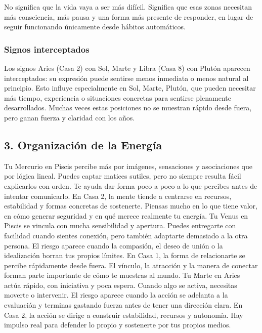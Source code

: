 \documentclass[11pt,a4paper]{article}\usepackage[utf8]{inputenc}
\begin{document}
No significa que la vida vaya a ser más difícil. Significa que esas zonas necesitan más consciencia, más pausa y una forma más presente de responder, en lugar de seguir funcionando únicamente desde hábitos automáticos.


\subsubsection*{Signos interceptados}
Los signos Aries (Casa 2) con Sol, Marte y Libra (Casa 8) con Plutón aparecen interceptados: su expresión puede sentirse menos inmediata o menos natural al principio. Esto influye especialmente en Sol, Marte, Plutón, que pueden necesitar más tiempo, experiencia o situaciones concretas para sentirse plenamente desarrollados. Muchas veces estas posiciones no se muestran rápido desde fuera, pero ganan fuerza y claridad con los años.

\vspace{0.8cm}

\subsection{3. Organización de la Energía}

Tu Mercurio en Piscis percibe más por imágenes, sensaciones y asociaciones que por lógica lineal. Puedes captar matices sutiles, pero no siempre resulta fácil explicarlos con orden. Te ayuda dar forma poco a poco a lo que percibes antes de intentar comunicarlo. En Casa 2, la mente tiende a centrarse en recursos, estabilidad y formas concretas de sostenerte. Piensas mucho en lo que tiene valor, en cómo generar seguridad y en qué merece realmente tu energía. Tu Venus en Piscis se vincula con mucha sensibilidad y apertura. Puedes entregarte con facilidad cuando sientes conexión, pero también adaptarte demasiado a la otra persona. El riesgo aparece cuando la compasión, el deseo de unión o la idealización borran tus propios límites. En Casa 1, la forma de relacionarte se percibe rápidamente desde fuera. El vínculo, la atracción y la manera de conectar forman parte importante de cómo te muestras al mundo. Tu Marte en Aries actúa rápido, con iniciativa y poca espera. Cuando algo se activa, necesitas moverte o intervenir. El riesgo aparece cuando la acción se adelanta a la evaluación y terminas gastando fuerza antes de tener una dirección clara. En Casa 2, la acción se dirige a construir estabilidad, recursos y autonomía. Hay impulso real para defender lo propio y sostenerte por tus propios medios.
\end{document}
